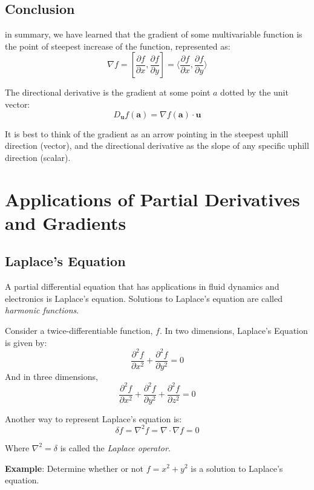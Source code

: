 \subsection{Conclusion}
in summary, we have learned that the gradient of some multivariable function is the point of steepest increase of the function, represented as:
$$\nabla f = \left[ \frac{\partial f}{\partial x}, \frac{\partial f}{
\partial y} \right] = \langle{ \frac{\partial f}{\partial x}, \frac{\partial f}{
\partial y} \rangle}$$

The directional derivative is the gradient at some point $a$ dotted by the unit vector:
$$
D_{\mathbf{u}} f(\mathbf{a}) = \nabla f(\mathbf{a}) \cdot \mathbf{u}
$$

It is best to think of the gradient as an arrow pointing in the steepest uphill direction (vector), and the directional derivative as the slope of any specific uphill direction (scalar). 


\section{Applications of Partial Derivatives and Gradients}

\subsection{Laplace's Equation}
A partial differential equation that has applications in fluid dynamics and 
electronics is Laplace's equation. Solutions to 
Laplace's equation are called \textit{harmonic functions}. 

\begin{mdframed}[style = important, frametitle = {Laplace's Equation}]
Consider a twice-differentiable function, $f$. In two dimensions, Laplace's 
Equation is given by:
$$ \frac{\partial ^2 f}{\partial x^2} + \frac{\partial^2 f}{\partial y^2} = 0$$
And in three dimensions, 
$$\frac{\partial ^2 f}{\partial x^2} + \frac{\partial ^2 f}{\partial y^2} + 
\frac{\partial ^2 f}{\partial z^2} = 0$$
\end{mdframed}

Another way to represent Laplace's equation is:
$$\delta f = \nabla^2 f = \nabla \cdot \nabla f = 0$$

Where $\nabla ^2 = \delta$ is called the \textit{Laplace operator}. 

\textbf{Example}: Determine whether or not $f = x^2 + y^2$ is a solution to 
Laplace's equation. 

